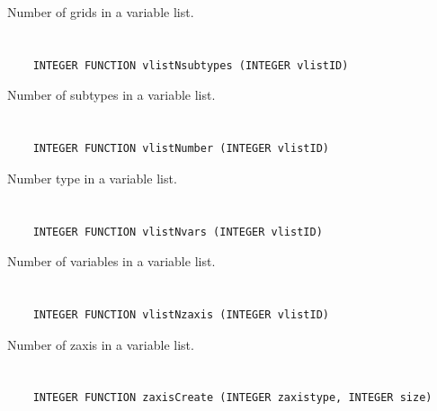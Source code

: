 Number of grids in a variable list.


\section*{\tt {}}

\begin{verbatim}
    INTEGER FUNCTION vlistNsubtypes (INTEGER vlistID)
\end{verbatim}

Number of subtypes in a variable list.


\section*{\tt {}}

\begin{verbatim}
    INTEGER FUNCTION vlistNumber (INTEGER vlistID)
\end{verbatim}

Number type in a variable list.


\section*{\tt {}}

\begin{verbatim}
    INTEGER FUNCTION vlistNvars (INTEGER vlistID)
\end{verbatim}

Number of variables in a variable list.


\section*{\tt {}}

\begin{verbatim}
    INTEGER FUNCTION vlistNzaxis (INTEGER vlistID)
\end{verbatim}

Number of zaxis in a variable list.


\section*{\tt {}}

\begin{verbatim}
    INTEGER FUNCTION zaxisCreate (INTEGER zaxistype, INTEGER size)
\end{verbatim}


